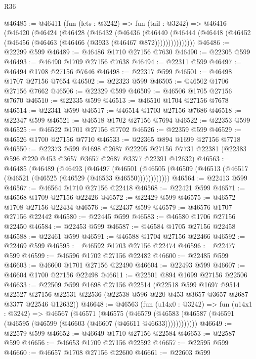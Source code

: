 \begin{lexlean}{R36}
\begin{coremodule}
@46485 := @46411
    (fun (lets : @3242) =>
    fun (tail : @3242) =>
    @46416
      (@46420
        (@46424
          (@46428
            (@46432
              (@46436
                (@46440
                  (@46444 (@46448 (@46452 (@46456 (@46463 (@46466 (@3933 (@46467 @872)))))))))))))))
@46486 := @22299 @599
@46489 := @46486 @1710 @27156 @7630
@46490 := @22305 @599
@46493 := @46490 @1709 @27156 @7638
@46494 := @22311 @599
@46497 := @46494 @1708 @27156 @7646
@46498 := @22317 @599
@46501 := @46498 @1707 @27156 @7654
@46502 := @22323 @599
@46505 := @46502 @1706 @27156 @7662
@46506 := @22329 @599
@46509 := @46506 @1705 @27156 @7670
@46510 := @22335 @599
@46513 := @46510 @1704 @27156 @7678
@46514 := @22341 @599
@46517 := @46514 @1703 @27156 @7686
@46518 := @22347 @599
@46521 := @46518 @1702 @27156 @7694
@46522 := @22353 @599
@46525 := @46522 @1701 @27156 @7702
@46526 := @22359 @599
@46529 := @46526 @1700 @27156 @7710
@46533 := @22365 @894 @1699 @27156 @7718
@46550 := @22373
    @599
    @1698
    @2687
    @22295
    @27156
    @7731
    @22381
    (@22383 @596 @220 @453 @3657 @3657 @2687 @3377 @22391 @12632)
@46563 := @46485
    (@46489
      (@46493
        (@46497
          (@46501 (@46505 (@46509 (@46513 (@46517 (@46521 (@46525 (@46529 (@46533 @46550))))))))))))
@46564 := @22413 @599
@46567 := @46564 @1710 @27156 @22418
@46568 := @22421 @599
@46571 := @46568 @1709 @27156 @22426
@46572 := @22429 @599
@46575 := @46572 @1708 @27156 @22434
@46576 := @22437 @599
@46579 := @46576 @1707 @27156 @22442
@46580 := @22445 @599
@46583 := @46580 @1706 @27156 @22450
@46584 := @22453 @599
@46587 := @46584 @1705 @27156 @22458
@46588 := @22461 @599
@46591 := @46588 @1704 @27156 @22466
@46592 := @22469 @599
@46595 := @46592 @1703 @27156 @22474
@46596 := @22477 @599
@46599 := @46596 @1702 @27156 @22482
@46600 := @22485 @599
@46603 := @46600 @1701 @27156 @22490
@46604 := @22493 @599
@46607 := @46604 @1700 @27156 @22498
@46611 := @22501 @894 @1699 @27156 @22506
@46633 := @22509
    @599
    @1698
    @27156
    @22514
    (@22518
      @599
      @1697
      @9514
      @22527
      @27156
      @22531
      @22536
      (@22538 @596 @220 @453 @3657 @3657 @2687 @3377 @22546 @12632))
@46648 := @46563
    (fun (u14x0 : @3242) =>
    fun (u14x1 : @3242) =>
    @46567
      (@46571
        (@46575
          (@46579 (@46583 (@46587 (@46591 (@46595 (@46599 (@46603 (@46607 (@46611 @46633))))))))))))
@46649 := @22579 @599
@46652 := @46649 @1710 @27156 @22584
@46653 := @22587 @599
@46656 := @46653 @1709 @27156 @22592
@46657 := @22595 @599
@46660 := @46657 @1708 @27156 @22600
@46661 := @22603 @599

\end{coremodule}
\end{lexlean}
